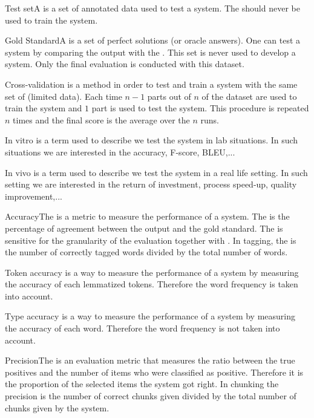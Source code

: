\begin{df}{Test set}A \sb{} is a set of annotated data used to test a system. The \sb{} should never be used to train the system.
\end{df}
\begin{df}{Gold Standard}A \sb{} is a set of perfect solutions (or oracle answers). One can test a system by comparing the output with the \sb{}. This set is never used to develop a system. Only the final evaluation is conducted with this dataset.
\end{df}
\begin{df}{Cross-validation}\sb{} is a method in order to test and train a system with the same set of (limited data). Each time $n-1$ parts out of $n$ of the dataset are used to train the system and $1$ part is used to test the system. This procedure is repeated $n$ times and the final score is the average over the $n$ runs.
\end{df}
\begin{df}{In vitro}\sb{} is a term used to describe we test the system in lab situations. In such situations we are interested in the accuracy, F-score, BLEU,...
\end{df}
\begin{df}{In vivo}\sb{} is a term used to describe we test the system in a real life setting. In such setting we are interested in the return of investment, process speed-up, quality improvement,...
\end{df}
\begin{df}{Accuracy}The \sb{} is a metric to measure the performance of a system. The \sb{} is the percentage of agreement between the output and the gold standard. The \sb{} is sensitive for the granularity of the evaluation together with . In \pos{} tagging, the \sb{} is the number of correctly tagged words divided by the total number of words.
\end{df}
\begin{df}{Token accuracy}\sb{} is a way to measure the performance of a system by measuring the accuracy of each lemmatized tokens. Therefore the word frequency is taken into account.
\end{df}
\begin{df}{Type accuracy}\sb{} is a way to measure the performance of a system by measuring the accuracy of each word. Therefore the word frequency is not taken into account.
\end{df}
\begin{df}{Precision}The \sb{} is an evaluation metric that measures the ratio between the true positives and the number of items who were classified as positive. Therefore it is the proportion of the selected items the system got right. In chunking the precision is the number of correct chunks given divided by the total number of chunks given by the system.
\end{df}
